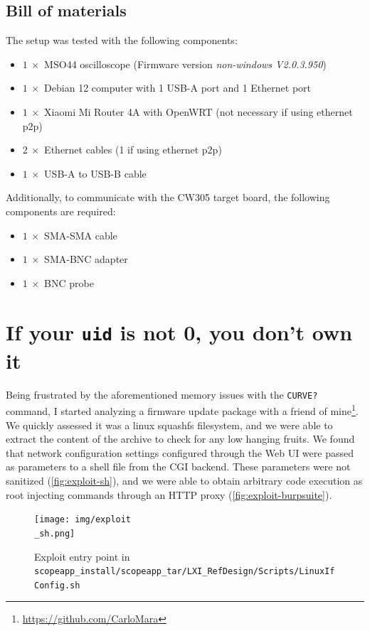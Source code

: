 \documentclass[a4paper,english,twoside,10pt]{article}
\begin{document}
\subsection{Bill of materials}
The setup was tested with the following components:
\begin{itemize}
	\item \(1 \ \times\) MSO44 oscilloscope (Firmware version \textit{non-windows V2.0.3.950})
	\item \(1 \ \times\) Debian 12 computer with 1 USB-A port and 1 Ethernet port
	\item \(1 \ \times\) Xiaomi Mi Router 4A with OpenWRT (not necessary if using ethernet p2p)
	\item \(2 \ \times\) Ethernet cables (1 if using ethernet p2p)
	\item \(1 \ \times\) USB-A to USB-B cable
\end{itemize}
Additionally, to communicate with the CW305\cite{cw305:spec} target board, the following components are required:
\begin{itemize}
	\item \(1 \ \times\) SMA-SMA cable
	\item \(1 \ \times\) SMA-BNC adapter
	\item \(1 \ \times\) BNC probe
\end{itemize}
\section{If your \texttt{uid} is not 0, you don't own it}
Being frustrated by the aforementioned memory issues with the \texttt{CURVE?} command, I started analyzing a firmware update package with a friend of mine\footnote{\url{https://github.com/CarloMara}}. We quickly assessed it was a linux squashfs filesystem, and we were able to extract the content of the archive to check for any low hanging fruits. We found that network configuration settings configured through the Web UI were passed as parameters to a shell file from the CGI backend. These parameters were not sanitized (\autoref{fig:exploit-sh}), and we were able to obtain arbitrary code execution as root injecting commands through an HTTP proxy (\autoref{fig:exploit-burpsuite}).

\begin{figure}[htbp]
	\centering
	\texttt{[image: img/exploit\\\_sh.png]}
	\caption{Exploit entry point in \texttt{scopeapp\_install/scopeapp\_tar/LXI\_RefDesign/Scripts/LinuxIfConfig.sh}}\label{fig:exploit-sh}
\end{figure}
\end{document}
